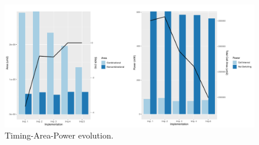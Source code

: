 \documentclass[journal,comsoc]{IEEEtran}
\begin{document}
\begin{figure}[ht!]
	\centering
	\includegraphics[width=0.85\linewidth]{Diagramas/areaTiempoPower.pdf}
	\caption{Timing-Area-Power evolution.}
	\label{fig:atp}
\end{figure}


\newpage


\end{document}

